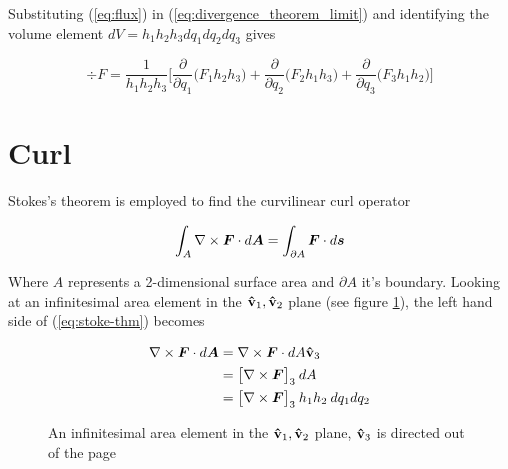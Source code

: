 \documentclass[twoside, a4paper]{article}
\begin{document}
Substituting (\ref{eq:flux}) in (\ref{eq:divergence_theorem_limit}) and identifying the volume element $dV = h_1 h_2 h_3 dq_1 dq_2 dq_3$ gives

\begin{equation}
\label{eq:div}
\boxed{
\div{F} =
\frac{1}{h_1 h_2 h_3} 
\Big[
\frac{\partial}{\partial q_1} \big( F_1 h_2 h_3 \big) + 
\frac{\partial}{\partial q_2} \big( F_2 h_1 h_3 \big) + 
\frac{\partial}{\partial q_3} \big( F_3 h_1 h_2 \big) 
\Big]
}
\end{equation}

\section{Curl}

Stokes's theorem is employed to find the curvilinear curl operator

\begin{equation}
\label{eq:stoke-thm}
\int_{A} \nabla \times \mbox{\boldmath$ F $} \cdot d\mbox{\boldmath$ A $} = \int_{\partial A} \mbox{\boldmath$ F $} \cdot d\mbox{\boldmath$ s $}
\end{equation}

Where $A$ represents a 2-dimensional surface area and $\partial A$ it's boundary. Looking at an infinitesimal area element in the $\mathbf{\hat{v}}_1, \mathbf{\hat{v}}_2$ plane (see figure \ref{fig:curl}), the left hand side of (\ref{eq:stoke-thm}) becomes

\begin{equation}
\label{eq:stokes-lhs}
\begin{split}
\nabla \times \mbox{\boldmath$ F $} \cdot d\mbox{\boldmath$ A $} & = \nabla \times \mbox{\boldmath$ F $} \cdot dA \mathbf{\hat{v}}_3 \\
& = \big[ \nabla \times \mbox{\boldmath$ F $} \big]_3 \: dA \\
& = \big[ \nabla \times \mbox{\boldmath$ F $} \big]_3 \: h_1 h_2 \: dq_1 dq_2
\end{split}
\end{equation}

\begin{figure}[htbp]
	\centering
	\caption{An infinitesimal area element in the $\mathbf{\hat{v}}_1,\mathbf{\hat{v}}_2$ plane, $\mathbf{\hat{v}}_3$ is directed out of the page}
	\label{fig:curl}
\end{figure}
\end{document}
